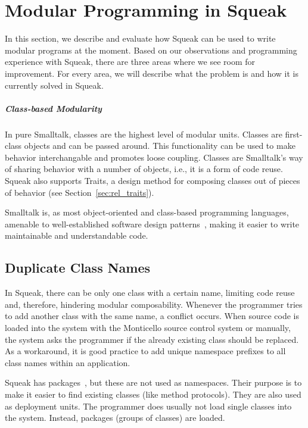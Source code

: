 \chapter{Modular Programming in Squeak}
\label{sec:problem}
In this section, we describe and evaluate how Squeak can be used to write modular programs at the moment. Based on our observations and programming experience with Squeak, there are three areas where we see room for improvement. For every area, we will describe what the problem is and how it is currently solved in Squeak.

\paragraph{Class-based Modularity}
In pure Smalltalk, classes are the highest level of modular units. Classes are first-class objects and can be passed around. This functionality can be used to make behavior interchangable and promotes loose coupling. Classes are Smalltalk's way of sharing behavior with a number of objects, i.e., it is a form of code reuse. Squeak also supports Traits, a design method for composing classes out of pieces of behavior (see Section~\ref{sec:rel_traits}).

Smalltalk is, as most object-oriented and class-based programming languages, amenable to well-established software design patterns~\cite{Gamma:1995:DPE:186897}, making it easier to write maintainable and understandable code.

\section{Duplicate Class Names}
In Squeak, there can be only one class with a certain name, limiting code reuse and, therefore, hindering modular composability. Whenever the programmer tries to add another class with the same name, a conflict occurs. When source code is loaded into the system with the Monticello source control system or manually, the system asks the programmer if the already existing class should be replaced. As a workaround, it is good practice to add unique namespace prefixes to all class names within an application. 

Squeak has packages~\cite{Nierstrasz:2009:SE:1816759}, but these are not used as namespaces. Their purpose is to make it easier to find existing classes (like method protocols). They are also used as deployment units. The programmer does usually not load single classes into the system. Instead, packages (groups of classes) are loaded. 

